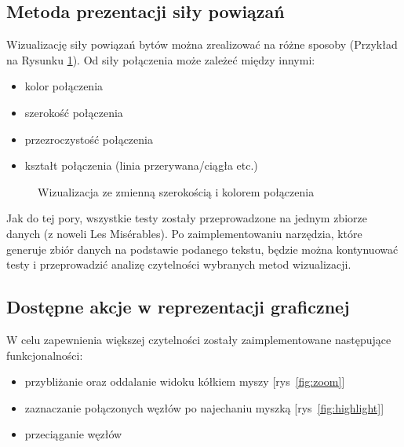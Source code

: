 \documentclass[12pt,a4paper]{article} %
\begin{document}
\subsection{Metoda prezentacji siły powiązań}

Wizualizację siły powiązań bytów można zrealizować na różne sposoby (Przykład na Rysunku \ref{fig:caw}). Od siły połączenia może zależeć między innymi:

\begin{itemize}
    \item kolor połączenia
    \item szerokość połączenia
    \item przezroczystość połączenia
    \item kształt połączenia (linia przerywana/ciągła etc.)
\end{itemize}

\begin{figure}[h]
\caption{Wizualizacja ze zmienną szerokością i kolorem połączenia}
\label{fig:caw}
\centering
\end{figure}

Jak do tej pory, wszystkie testy zostały przeprowadzone na jednym zbiorze danych (z noweli Les Mis\'erables). Po zaimplementowaniu narzędzia, które generuje zbiór danych na podstawie podanego tekstu, będzie można kontynuować testy i przeprowadzić analizę czytelności wybranych metod wizualizacji.

\newpage

\subsection{Dostępne akcje w reprezentacji graficznej}
W celu zapewnienia większej czytelności zostały zaimplementowane następujące funkcjonalności:
\begin{itemize}
    \item przybliżanie oraz oddalanie widoku kółkiem myszy [rys~\ref{fig:zoom}]
    \item zaznaczanie połączonych węzłów po najechaniu myszką [rys~\ref{fig:highlight}]
    \item przeciąganie węzłów
\end{itemize}
\end{document}
